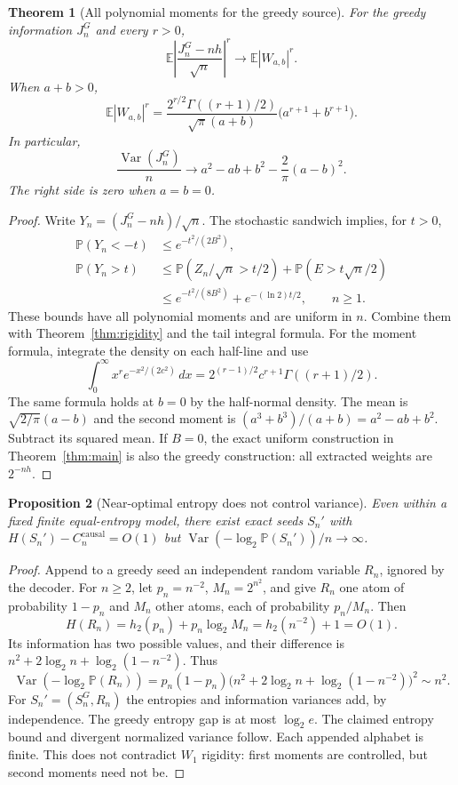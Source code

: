 \documentclass[11pt,a4paper]{article}
\newtheorem{theorem}{Theorem}
\newtheorem{proposition}[theorem]{Proposition}
\newcommand{\E}{\mathbb E}
\newcommand{\Prob}{\mathbb P}
\newcommand{\causal}{\mathrm{causal}}
\begin{document}
\begin{theorem}[All polynomial moments for the greedy source]\label{thm:moments}
For the greedy information $J_n^G$ and every $r>0$,
\[
\E\left|\frac{J_n^G-nh}{\sqrt n}\right|^r\longrightarrow\E|W_{a,b}|^r.
\]
When $a+b>0$,
\begin{equation}\label{eq:absmoment}
\E|W_{a,b}|^r
=\frac{2^{r/2}\Gamma((r+1)/2)}{\sqrt\pi(a+b)}
\bigl(a^{r+1}+b^{r+1}\bigr).
\end{equation}
In particular,
\begin{equation}\label{eq:variance}
\frac{\operatorname{Var}(J_n^G)}n
\longrightarrow a^2-ab+b^2-\frac2\pi(a-b)^2.
\end{equation}
The right side is zero when $a=b=0$.
\end{theorem}
\begin{proof}
Write $Y_n=(J_n^G-nh)/\sqrt n$. The stochastic sandwich implies, for $t>0$,
\begin{align*}
\Prob(Y_n<-t)&\le e^{-t^2/(2B^2)},\\
\Prob(Y_n>t)&\le\Prob(Z_n/\sqrt n>t/2)+\Prob(E>t\sqrt n/2)\\
&\le e^{-t^2/(8B^2)}+e^{-(\ln2)t/2},\qquad n\ge1.
\end{align*}
These bounds have all polynomial moments and are uniform in $n$.
Combine them with Theorem~\ref{thm:rigidity} and the tail integral formula.
For the moment formula, integrate the density on each half-line and use
\[
\int_0^\infty x^r e^{-x^2/(2c^2)}\,dx
=2^{(r-1)/2}c^{r+1}\Gamma((r+1)/2).
\]
The same formula holds at $b=0$ by the half-normal density.
The mean is $\sqrt{2/\pi}(a-b)$ and the second moment is
$(a^3+b^3)/(a+b)=a^2-ab+b^2$. Subtract its squared mean.
If $B=0$, the exact uniform construction in Theorem~\ref{thm:main}
is also the greedy construction: all extracted weights are $2^{-nh}$.
\end{proof}

\begin{proposition}[Near-optimal entropy does not control variance]\label{prop:rare}
Even within a fixed finite equal-entropy model, there exist exact seeds
$S_n'$ with $H(S_n')-C_n^{\causal}=O(1)$ but
$\operatorname{Var}(-\log_2\Prob(S_n'))/n\to\infty$.
\end{proposition}
\begin{proof}
Append to a greedy seed an independent random variable $R_n$, ignored
by the decoder. For $n\ge2$, let $p_n=n^{-2}$, $M_n=2^{n^2}$, and give
$R_n$ one atom of probability $1-p_n$ and $M_n$ other atoms, each of
probability $p_n/M_n$. Then
\[
H(R_n)=h_2(p_n)+p_n\log_2M_n=h_2(n^{-2})+1=O(1).
\]
Its information has two possible values, and their difference is
$n^2+2\log_2n+\log_2(1-n^{-2})$. Thus
\[
\operatorname{Var}(-\log_2\Prob(R_n))
=p_n(1-p_n)
\bigl(n^2+2\log_2n+\log_2(1-n^{-2})\bigr)^2\sim n^2.
\]
For $S_n'=(S_n^G,R_n)$ the entropies and information variances add,
by independence. The greedy entropy gap is at most $\log_2e$.
The claimed entropy bound and divergent normalized variance follow.
Each appended alphabet is finite. This does not contradict $W_1$
rigidity: first moments are controlled, but second moments need not be.
\end{proof}
\end{document}
